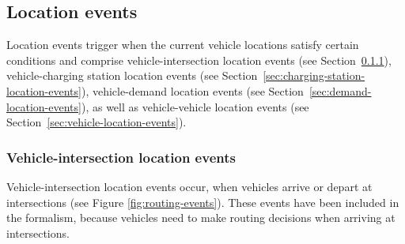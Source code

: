 \documentclass[graybox]{svmult}
\begin{document}
\subsection{Location events}
\label{sec:location-events}

Location events trigger when the current vehicle locations satisfy certain conditions and comprise vehicle-intersection location events (see Section~\ref{sec:intersection-location-event}), vehicle-charging station location events (see Section~\ref{sec:charging-station-location-events}), vehicle-demand location events (see Section~\ref{sec:demand-location-events}), as well as vehicle-vehicle location events (see Section~\ref{sec:vehicle-location-events}).

\subsubsection{Vehicle-intersection location events}
\label{sec:intersection-location-event}

Vehicle-intersection location events occur, when vehicles arrive or depart at intersections (see Figure \ref{fig:routing-events}).
These events have been included in the formalism, because vehicles need to make routing decisions when arriving at intersections.
\end{document}
